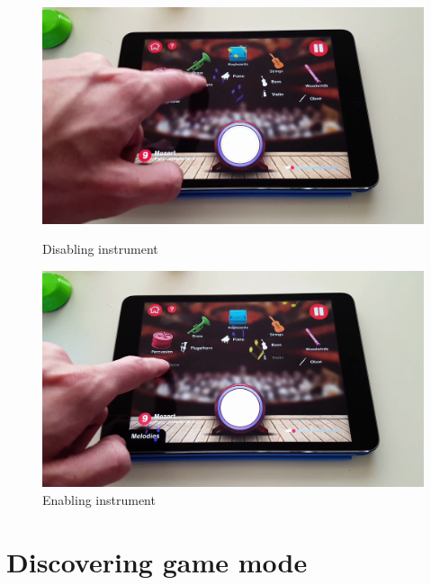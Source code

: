 \begin{figure}[ht!]
  \centering
  \includegraphics[width=350pt]{graphics/game-play/disable_instrument_conducting.png}
  \vspace{0.05cm}
  \caption{Disabling instrument}
  \vspace{1cm}

  \includegraphics[width=350pt]{graphics/game-play/enable_instrument_conducting.png}
  \vspace{0.05cm}
  \caption{Enabling instrument}
\end{figure}

\section{Discovering game mode}

